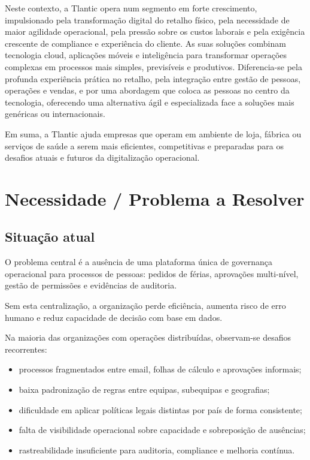 \documentclass[11pt,a4paper]{article}
\begin{document}
Neste contexto, a Tlantic opera num segmento em forte crescimento, impulsionado pela transformação digital do retalho físico, pela necessidade de maior agilidade operacional, pela pressão sobre os custos laborais e pela exigência crescente de compliance e experiência do cliente. As suas soluções combinam tecnologia cloud, aplicações móveis e inteligência para transformar operações complexas em processos mais simples, previsíveis e produtivos. Diferencia-se pela profunda experiência prática no retalho, pela integração entre gestão de pessoas, operações e vendas, e por uma abordagem que coloca as pessoas no centro da tecnologia, oferecendo uma alternativa ágil e especializada face a soluções mais genéricas ou internacionais.

Em suma, a Tlantic ajuda empresas que operam em ambiente de loja, fábrica ou serviços de saúde a serem mais eficientes, competitivas e preparadas para os desafios atuais e futuros da digitalização operacional.

\section{Necessidade / Problema a Resolver}
\subsection{Situação atual}
O problema central é a ausência de uma plataforma única de governança operacional para processos de pessoas: pedidos de férias, aprovações multi-nível, gestão de permissões e evidências de auditoria.

Sem esta centralização, a organização perde eficiência, aumenta risco de erro humano e reduz capacidade de decisão com base em dados.

Na maioria das organizações com operações distribuídas, observam-se desafios recorrentes:

\begin{itemize}
  \item processos fragmentados entre email, folhas de cálculo e aprovações informais;
  \item baixa padronização de regras entre equipas, subequipas e geografias;
  \item dificuldade em aplicar políticas legais distintas por país de forma consistente;
  \item falta de visibilidade operacional sobre capacidade e sobreposição de ausências;
  \item rastreabilidade insuficiente para auditoria, compliance e melhoria contínua.
\end{itemize}
\end{document}

